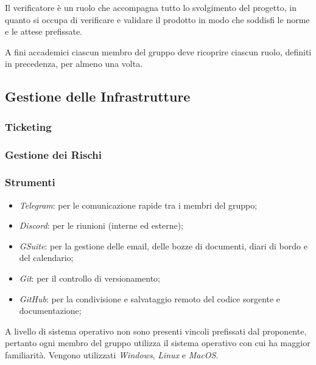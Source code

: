        Il verificatore è un ruolo che accompagna tutto lo svolgimento del progetto, in quanto si occupa di verificare e validare il prodotto in modo che soddisfi le norme e le attese prefissate.
        \bigskip
        \begin{flushleft}
        A fini accademici ciascun membro del gruppo deve ricoprire ciascun ruolo, definiti in precedenza, per almeno una volta.
        \end{flushleft}


    \subsection{Gestione delle Infrastrutture}
        \subsubsection{Ticketing}
        \subsubsection{Gestione dei Rischi}
        \subsubsection{Strumenti}
            \begin{itemize}
                \item \textit{Telegram}: per le comunicazione rapide tra i membri del gruppo;
                \item \textit{Discord}: per le riunioni (interne ed esterne);
                \item \textit{GSuite}: per la gestione delle email, delle bozze di documenti, diari di bordo e del calendario;
                \item \textit{Git}: per il controllo di versionamento;
                \item \textit{GitHub}: per la condivisione e salvataggio remoto del codice sorgente e documentazione;
            \end{itemize}
            
            A livello di sistema operativo non sono presenti vincoli prefissati dal proponente, pertanto ogni membro del gruppo utilizza il sistema operativo con cui ha maggior familiarità.
            Vengono utilizzati \textit{Windows}, \textit{Linux} e \textit{MacOS}.

